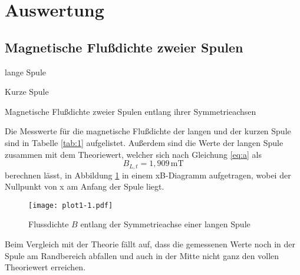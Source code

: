 \section{Auswertung}
\label{sec:Auswertung}
\subsection{Magnetische Flußdichte zweier Spulen}
 \begin{table}[H]
  \centering
    \begin{subtable}{.4\linewidth}
      \centering
  \caption{lange Spule}
    \end{subtable} 
    \begin{subtable}{.4\linewidth}
      \centering
  
  \caption{Kurze Spule}
 
    \end{subtable} 
        \caption{Magnetische Flußdichte zweier Spulen entlang ihrer Symmetrieachsen}
    \label{tab:1}
\end{table}


\noindent Die Messwerte für die magnetische Flußdichte der 
langen und der kurzen Spule sind in Tabelle \ref{tab:1} aufgelistet.
Außerdem sind die Werte der langen Spule zusammen mit
dem Theoriewert, welcher sich nach Gleichung \ref{eq:a} als
\begin{equation}
  B_{L,t}=1,909\,\si{\milli\tesla}\nonumber
\end{equation}
berechnen lässt, in Abbildung \ref{fig:a} in einem
xB-Diagramm aufgetragen, wobei der Nullpunkt
von x am Anfang der Spule liegt. 

\begin{figure}[H]
\centering
  \texttt{[image: plot1-1.pdf]}
  \caption{Flussdichte $B$ entlang der Symmetrieachse einer langen Spule}
  \label{fig:a}
\end{figure}
\noindent Beim Vergleich mit der Theorie fällt auf, dass
die gemessenen Werte noch in der Spule am Randbereich
abfallen und auch in der Mitte nicht ganz den vollen
Theoriewert erreichen.


